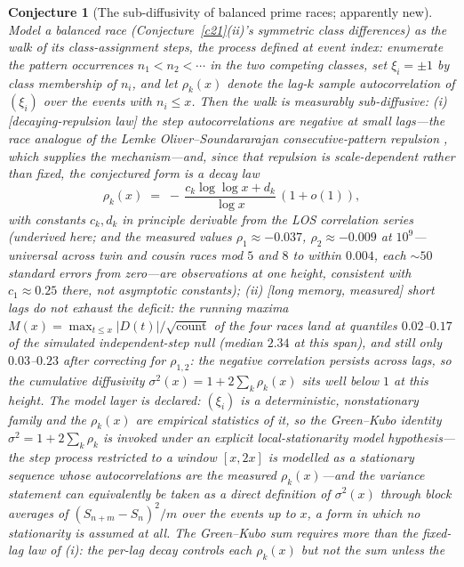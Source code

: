 \documentclass[11pt]{article}
\newtheorem{conjecture}{Conjecture}
\theoremstyle{definition}
\begin{document}
\setcounter{conjecture}{8}%
\begin{conjecture}[The sub-diffusivity of balanced prime races;
apparently new]\label{c18}
Model a balanced race (Conjecture~\ref{c21}(ii)'s symmetric class
differences) as the walk of its class-assignment steps, the process
defined at event index: enumerate
the pattern occurrences $n_1<n_2<\cdots$ in the two competing
classes, set $\xi_i=\pm1$ by class membership of $n_i$, and let
$\rho_k(x)$ denote the lag-$k$ sample autocorrelation of
$(\xi_i)$ over the events with $n_i\le x$.  Then the
walk is measurably \emph{sub-diffusive}:
\emph{(i)} [decaying-repulsion law] the step autocorrelations are
negative at small lags---the race analogue of the Lemke
Oliver--Soundararajan consecutive-pattern repulsion \cite{LOS},
which supplies the mechanism---and, since that repulsion is
scale-dependent rather than fixed, the conjectured form is a decay
law
\[
\rho_k(x)\;=\;-\,\frac{c_k\log\log x+d_k}{\log x}\,(1+o(1)),
\]
with constants $c_k,d_k$ in principle derivable from the LOS
correlation series (underived here; and the measured values
$\rho_1\approx-0.037$, $\rho_2\approx-0.009$ at $10^9$---universal
across twin and cousin races mod $5$ and $8$ to within $0.004$, each
${\sim}50$ standard errors from zero---are observations at one height,
consistent with $c_1\approx0.25$ there, not asymptotic constants);
\emph{(ii)} [long memory, measured] short lags do not exhaust the
deficit: the running maxima
$M(x)=\max_{t\le x}|D(t)|/\sqrt{\text{count}}$ of the four races
land at quantiles $0.02$--$0.17$ of the simulated independent-step
null (median $2.34$ at this span), and still only $0.03$--$0.23$
after correcting for $\rho_{1,2}$: the negative correlation persists
across lags, so the cumulative diffusivity
$\sigma^2(x)=1+2\sum_k\rho_k(x)$ sits well below $1$ at this
height.  The model layer is declared:
$(\xi_i)$ is a deterministic, nonstationary family and the
$\rho_k(x)$ are empirical statistics of it, so the Green--Kubo
identity $\sigma^2=1+2\sum_k\rho_k$ is invoked under an explicit
\emph{local-stationarity model hypothesis}---the step process
restricted to a window $[x,2x]$ is modelled as a stationary sequence
whose autocorrelations are the measured $\rho_k(x)$---and the
variance statement can equivalently be taken as a direct
\emph{definition} of $\sigma^2(x)$ through block averages of
$(S_{n+m}-S_n)^2/m$ over the events up to $x$, a form in which no
stationarity is assumed at all.  The Green--Kubo sum requires more than the
fixed-lag law
of (i): the
per-lag decay controls each $\rho_k(x)$ but not the sum unless the

\end{conjecture}
\end{document}
